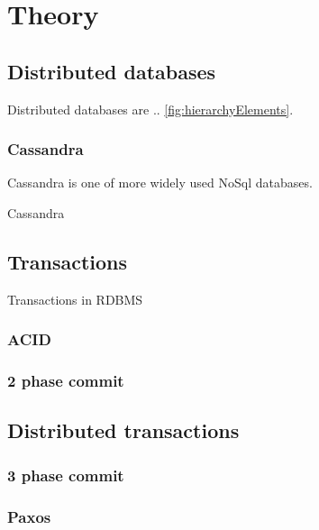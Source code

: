 
\chapter{Theory}\label{chapter:theory}

\section{Distributed databases}\label{sec:theory:distDbs}
Distributed databases are .. \ref{fig:hierarchyElements}. \cite{CassandraDataStaxDocs} \cite{chandra2007PaxosMadeLive} \cite{lamport1982byzantine}

\subsection{Cassandra}
Cassandra is one of more widely used NoSql databases. 

Cassandra


\section{Transactions}\label{sec:theory:transactions}
Transactions in RDBMS

\subsection{ACID}

\subsection{2 phase commit}

\section{Distributed transactions}

\subsection{3 phase commit}\label{sec:theory:transactions:3pc}

\subsection{Paxos}

